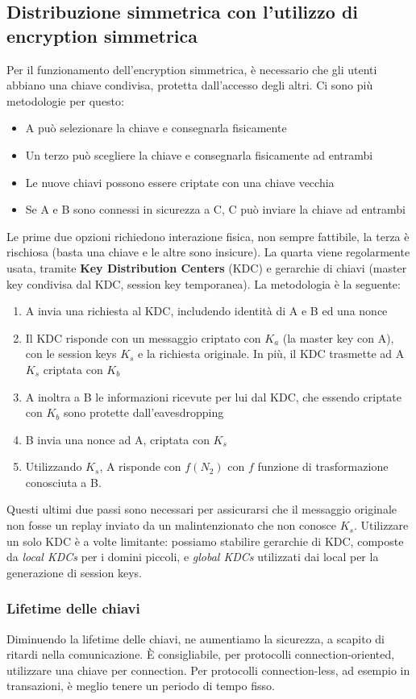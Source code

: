 \documentclass[11pt]{article}
\begin{document}
\subsection{Distribuzione simmetrica con l'utilizzo di encryption simmetrica}
Per il funzionamento dell'encryption simmetrica, è necessario che gli utenti abbiano una chiave condivisa, protetta dall'accesso degli altri. Ci sono più metodologie per questo:
\begin{itemize}
    \item A può selezionare la chiave e consegnarla fisicamente
    \item Un terzo può scegliere la chiave e consegnarla fisicamente ad entrambi 
    \item Le nuove chiavi possono essere criptate con una chiave vecchia
    \item Se A e B sono connessi in sicurezza a C, C può inviare la chiave ad entrambi
\end{itemize}
Le prime due opzioni richiedono interazione fisica, non sempre fattibile, la terza è rischiosa (basta una chiave e le altre sono insicure). La quarta viene regolarmente usata, tramite \textbf{Key Distribution Centers} (KDC) e gerarchie di chiavi (master key condivisa dal KDC, session key temporanea).
La metodologia è la seguente:
\begin{enumerate}
    \item A invia una richiesta al KDC, includendo identità di A e B ed una nonce 
    \item Il KDC risponde con un messaggio criptato con $K_a$ (la master key con A), con le session keys $K_s$ e la richiesta originale. In più, il KDC trasmette ad A $K_s$ criptata con $K_b$
    \item A inoltra a B le informazioni ricevute per lui dal KDC, che essendo criptate con $K_b$ sono protette dall'eavesdropping
    \item B invia una nonce ad A, criptata con $K_s$
    \item Utilizzando $K_s$, A risponde con $f(N_2)$ con $f$ funzione di trasformazione conosciuta a B.
\end{enumerate}
Questi ultimi due passi sono necessari per assicurarsi che il messaggio originale non fosse un replay inviato da un malintenzionato che non conosce $K_s$.
Utilizzare un solo KDC è a volte limitante: possiamo stabilire gerarchie di KDC, composte da \textit{local KDCs} per i domini piccoli, e \textit{global KDCs} utilizzati dai local per la generazione di session keys.
\subsubsection{Lifetime delle chiavi}
Diminuendo la lifetime delle chiavi, ne aumentiamo la sicurezza, a scapito di ritardi nella comunicazione. È consigliabile, per protocolli connection-oriented, utilizzare una chiave per connection. Per protocolli connection-less, ad esempio in transazioni, è meglio tenere un periodo di tempo fisso. 
\end{document}
